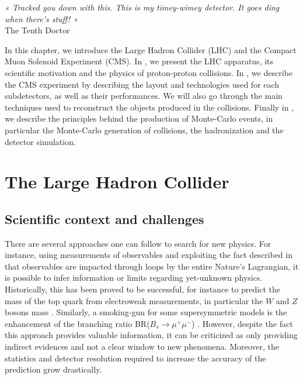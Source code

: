 
\setcounter{mtc}{3}
\vspace*{-0.7cm}
\hspace*{0.39\textwidth}
\begin{minipage}{0.6\textwidth}
\emph{« Tracked you down with this. This is my timey-wimey detector. It goes ding when there’s stuff! »}\\
\hspace*{0.6\textwidth} The Tenth Doctor
\end{minipage}
\minitoc
\newpage

    In this chapter, we introduce the Large Hadron Collider (LHC) and the Compact Muon Solenoid
    Experiment (CMS). In , we present the LHC apparatus,
    its scientific motivation and the physics of proton-proton collisions. In ,
    we describe the CMS experiment by describing the layout and technologies used for each
    subdetectors, as well as their performances. We will also go through the main techniques
    used to reconstruct the objects produced in the collisions. Finally in ,
    we describe the principles behind the production of Monte-Carlo events, in particular
    the Monte-Carlo generation of collisions, the hadronization and the detector simulation.

    \section{The Large Hadron Collider \label{sec:LHCintro}}

    \subsection{Scientific context and challenges}


    There are several approaches one can follow to search for new physics. For instance, using
     measurements of observables and exploiting the fact described in
     that observables are impacted through loops by
    the entire Nature's Lagrangian, it is possible to infer information or limits regarding
    yet-unknown physics. Historically, this has been proved to be successful,
    for instance to predict the mass of the top quark from electroweak measurements, in particular
    the $W$ and $Z$ bosons mass \cite{discoveryOfTopQuark}. Similarly, a smoking-gun for some supersymmetric
    models is the enhancement of the branching ratio BR($B_s \rightarrow \mu^+\mu^-$)
    \cite{BsToMuMu}. However,
    despite the fact this approach provides valuable information, it can be criticized as
    only providing indirect evidences and not a clear window to new phenomena. Moreover,
    the statistics and detector resolution required to increase the accuracy of the
    prediction grow drastically.

